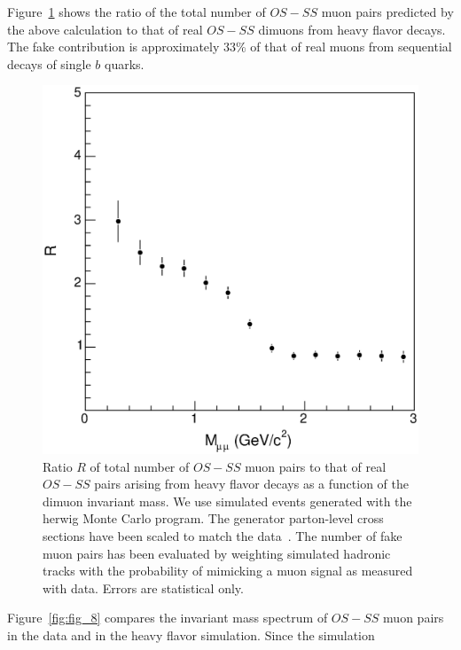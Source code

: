 \documentclass[aps,prd,preprint,floatfix,nofootinbib,superscriptaddress,showpacs,amssymb]{revtex4}
\begin{document}
 Figure~\ref{fig:fig_7} shows the ratio of the total number of $OS-SS$
 muon pairs predicted by the above calculation to that of real $OS-SS$
 dimuons from heavy flavor decays. The  fake contribution is approximately
 33\% of that of real muons from sequential decays of single $b$ quarks.
 \begin{figure}
 \begin{center}
 \vspace{-0.3in}
 \leavevmode
 \includegraphics*[width=\textwidth]{fa0_7.eps}
 \caption[]{Ratio $R$ of total number of $OS-SS$ muon pairs to that of real
            $OS-SS$ pairs arising from heavy flavor decays as a function of 
            the dimuon invariant mass. We use simulated events generated 
            with the {\sc herwig} Monte Carlo program. The generator 
            parton-level cross sections have been scaled to match the 
            data~\cite{bbxs}. The number of fake muon pairs has been
            evaluated by weighting simulated hadronic tracks with the
            probability of mimicking a muon signal as measured with data.
            Errors are statistical only.}
 \label{fig:fig_7}
 \end{center}
 \end{figure}
 Figure~\ref{fig:fig_8} compares the invariant mass spectrum of $OS-SS$ muon 
 pairs in the data and in the heavy flavor simulation. Since the simulation
\end{document}
